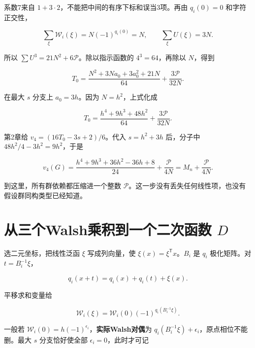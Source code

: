 \documentclass[UTF8,fontset=fandol,zihao=-4,openany,oneside]{ctexbook}
\begin{document}
系数7来自 \(1+3\cdot2\)，不能把中间的有序下标和误当3项。再由 \(q_i(0)=0\) 和字符正交性，



\[
\sum_\xi\mathcal W_i(\xi)=N(-1)^{q_i(0)}=N,
\qquad \sum_\xi U(\xi)=3N.
\]



所以 \(\sum U^3=21N^2+6\mathcal P\)。除以指示函数的 \(4^3=64\)，再除以 \(N\)，得到



\[
T_0=\frac{N^2+3Na_0+3a_0^2+21N}{64}
       +\frac{3\mathcal P}{32N}.
\tag{英文(3.1)}
\]



在最大 \(s\) 分支上 \(a_0=3h\)。因为 \(N=h^2\)，上式化成



\[
T_0=\frac{h^4+9h^3+48h^2}{64}+\frac{3\mathcal P}{32N}.
\]



第2章给 \(v_4=(16T_0-3s+2)/6\)。代入 \(s=h^2+3h\) 后，分子中 \(48h^2/4-3h^2=9h^2\)，于是



\[
v_4(G)=\frac{h^4+9h^3+36h^2-36h+8}{24}
         +\frac{\mathcal P}{4N}
=M_n+\frac{\mathcal P}{4N}.
\tag{英文(3.2)}
\]



到这里，所有群依赖都压缩进一个整数 \(\mathcal P\)。这一步没有丢失任何线性项，也没有假设群同构类型已经知道。



\section{从三个Walsh乘积到一个二次函数 \texorpdfstring{\(D\)}{D}}


选二元坐标，把线性泛函 \(\xi\) 写成列向量，使 \(\xi(x)=\xi^{\mathsf T}x\)。\(B_i\) 是 \(q_i\) 极化矩阵。对 \(t=B_i^{-1}\xi\)，



\[
q_i(x+t)=q_i(x)+q_i(t)+\xi(x).
\]



平移求和变量给



\[
\mathcal W_i(\xi)=\mathcal W_i(0)(-1)^{q_i(B_i^{-1}\xi)}.
\]



一般若 \(\mathcal W_i(0)=h(-1)^{\epsilon_i}\)，\textbf{实际Walsh对偶}为 \(q_i(B_i^{-1}\xi)+\epsilon_i\)，原点相位不能删。最大 \(s\) 分支恰好使全部 \(\epsilon_i=0\)，此时才可记
\end{document}
